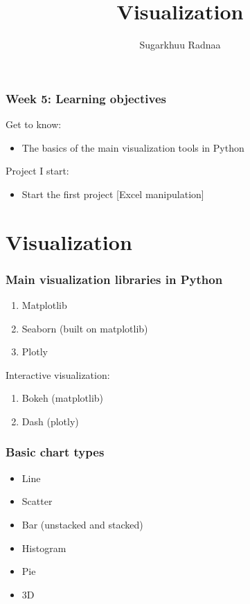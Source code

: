 \documentclass{beamer}
\title[Introduction to Python]{Visualization}
\author{Sugarkhuu Radnaa}
\institute[]
{
Py4Econ in Ulaanbaatar \\ 
\medskip
\textit{py4econ@gmail.com} 
}
\date{}  %
\begin{document}
\begin{frame}
\titlepage %
\end{frame}

\begin{frame}
    \frametitle{Week 5: Learning objectives}
    Get to know: 
    \begin{itemize}
        \item The basics of the main visualization tools in Python
    \end{itemize}
\vskip 1cm        
    Project I start:
    \begin{itemize} 
        \item Start the first project [Excel manipulation]
    \end{itemize}
\end{frame}

\section{Visualization} 

\begin{frame}
\frametitle{Main visualization libraries in Python}
    \begin{enumerate}
        \item Matplotlib
        \item Seaborn (built on matplotlib)
        \item Plotly       
    \end{enumerate}

\vskip 5mm
Interactive visualization:     
    \begin{enumerate}
        \item Bokeh (matplotlib) 
        \item Dash (plotly)
    \end{enumerate}

\end{frame}

\begin{frame}
    \frametitle{Basic chart types}
        \begin{itemize}
        \item Line
        \item Scatter
        \item Bar (unstacked and stacked)
        \item Histogram
        \item Pie
        \item 3D
        \end{itemize}
\end{frame}
\end{document}
